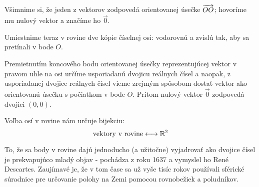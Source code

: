 \begin{center}
\end{center}

Všimnime si, že jeden z vektorov zodpovedá orientovanej úsečke $\overrightarrow{OO}$; hovoríme mu nulový vektor a značíme ho $\vec{0}$.

Umiestnime teraz v rovine dve kópie číselnej osi: vodorovnú a zvislú tak, aby sa pretínali v bode $O$.
\begin{center}
\end{center}

Premietnutím koncového bodu orientovanej úsečky reprezentujúcej vektor v pravom uhle na osi určíme usporiadanú dvojicu reálnych čísel a naopak, z usporiadanej dvojice reálnych čísel vieme zrejmým spôsobom dostať vektor ako orientovanú úsečku s počiatkom v bode $O$. Pritom nulový vektor $\vec{0}$ zodpovedá dvojici $(0,0)$.

Voľba osí v rovine nám určuje bijekciu:
$$ \text{vektory v rovine} \longleftrightarrow \mathbb{R}^2 $$

To, že sa body v rovine dajú jednoducho (a užitočne) vyjadrovať ako dvojice čísel je
prekvapujúco mladý objav - pochádza z roku 1637 a vymyslel ho René
Descartes. Zaujímavé je, že v tom čase sa už vyše tisíc rokov používali sférické
súradnice pre určovanie polohy na Zemi pomocou rovnobežiek a poludníkov.

